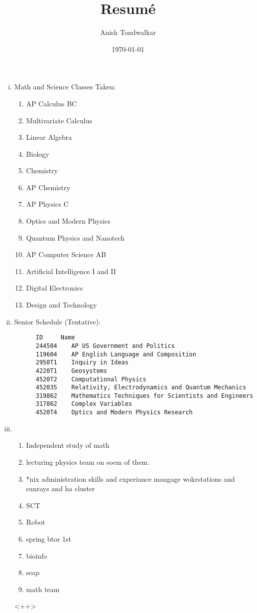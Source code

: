 \documentclass[11pt,notitlepage]{article}
\title{Resum\'e}
\author{Anish Tondwalkar}
\date{\today}
\begin{document}
\maketitle
\begin{enumerate}[i)]
  \item Math and Science Classes Taken: 
    \begin{enumerate}
    \item AP Calculus BC
    \item Multivariate Calculus
    \item Linear Algebra
    \item Biology
    \item Chemistry
    \item AP Chemistry
    \item AP Physics C
    \item Optics and Modern Physics
    \item Quantum Physics and Nanotech
    \item AP Computer Science AB
    \item Artificial Intelligence I and II
    \item Digital Electronics
    \item Design and Technology  
  \end{enumerate}
  \item Senior Schedule (Tentative): 
\begin{verbatim}
      ID     Name	
      244504	AP US Government and Politics
      119604	AP English Language and Composition
      2950T1	Inquiry in Ideas
      4220T1	Geosystems
      4520T2	Computational Physics
      452035	Relativity, Electrodynamics and Quantum Mechanics
      319862	Mathematics Techniques for Scientists and Engineers
      317862	Complex Variables
      4520T4	Optics and Modern Physics Research
\end{verbatim}
  \item 
    \begin{enumerate}
      \item Independent study of math
      \item lecturing physics team on soem of them.
      \item *nix administration skills and experiance  mangage wokrstations and sunrays and ha cluster 
      \item SCT
      \item Robot
      \item spring btor 1st
      \item bioinfo
      \item seap
      \item math team
    \end{enumerate}<++>
\end{enumerate}
\end{document}
